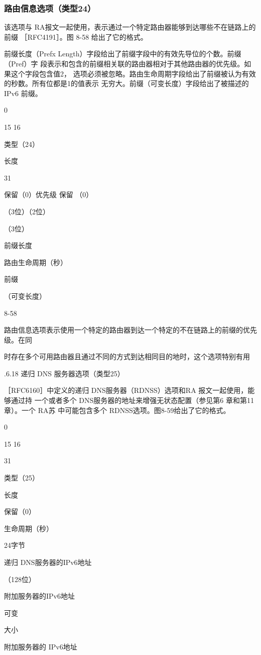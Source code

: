 \subsubsection{路由信息选项（类型24）}
该选项与 RA报文一起使用，表示通过一个特定路由器能够到达哪些不在链路上的前缀
［RFC4191］。图 8-58 给出了它的格式。

前缀长度（Prefx Length）字段给出了前缀字段中的有效先导位的个数。前缀（Pref）字
段表示和包含的前缀相关联的路由器相对于其他路由器的优先级。如果这个字段包含值2，
选项必须被忽略。路由生命周期字段给出了前缀被认为有效的秒数。所有位都是1的值表示
无穷大。前缀（可变长度）字段给出了被描述的IPv6 前缀。

0

15 16

类型（24）

长度

31

保留（0）优先级 保留 （0）

（3位）（2位）

（3位）

前缀长度

路由生命周期（秒）

前缀

（可变长度）

8-58

路由信息选项表示使用一个特定的路由器到达一个特定的不在链路上的前缀的优先级。在同

时存在多个可用路由器且通过不同的方式到达相同目的地时，这个选项特别有用

.6.18 递归 DNS 服务器选项（类型25）

［RFC6160］中定义的递归 DNS服务器（RDNSS）选项和RA 报文一起使用，能够通过持
一个或者多个 DNS服务器的地址来增强无状态配置（参见第6 章和第11章）。一个 RA苏
中可能包含多个 RDNSS选项。图8-59给出了它的格式。

0

15 16

31

类型（25）

长度

保留（0）

生命周期（秒）

24字节

递归 DNS服务器的IPv6地址

（128位）

附加服务器的IPv6地址

可变

大小

附加服务器的 IPv6地址

